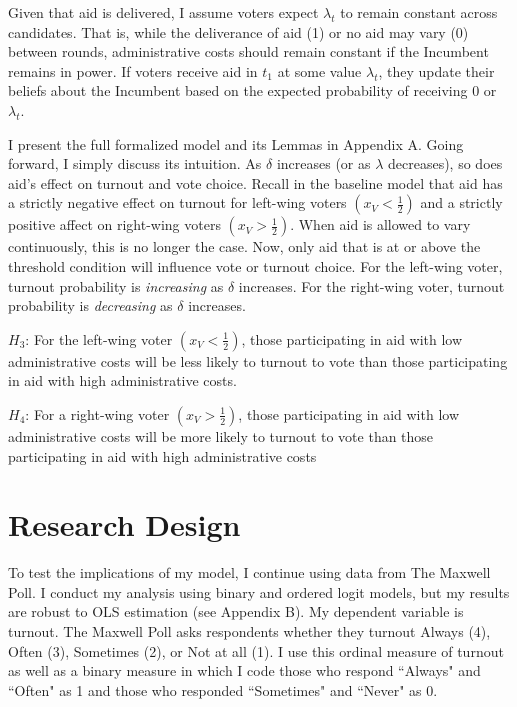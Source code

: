 \documentclass[12pt]{paper}
\begin{document}
Given that aid is delivered, I assume voters expect $\lambda_t$ to remain constant across candidates. That is, while the deliverance of aid (1) or no aid may vary (0) between rounds, administrative costs should remain constant if the Incumbent remains in power. If voters receive aid in $t_1$ at some value $\lambda_t$, they update their beliefs about the Incumbent based on the expected probability of receiving 0 or $\lambda_t$.

I present the full formalized model and its Lemmas in Appendix A. Going forward, I simply discuss its intuition. As $\delta$ increases (or as $\lambda$ decreases), so does aid's effect on turnout and vote choice. Recall in the baseline model that aid has a strictly negative effect on turnout for left-wing voters $(x_V < \frac{1}{2})$ and a strictly positive affect on right-wing voters $(x_V > \frac{1}{2})$. When aid is allowed to vary continuously, this is no longer the case. Now, only aid that is at or above the threshold condition will influence vote or turnout choice. For the left-wing voter, turnout probability is \textit{increasing} as $\delta$ increases. For the right-wing voter, turnout probability is \textit{decreasing} as $\delta$ increases.

$H_3$: For the left-wing voter $(x_V < \frac{1}{2})$, those participating in aid with low administrative costs will be less likely to turnout to vote than those participating in aid with high administrative costs.

$H_4$: For a right-wing voter $(x_V > \frac{1}{2})$, those participating in aid with low administrative costs will be more likely to turnout to vote than those participating in aid with high administrative costs

\section{Research Design}
To test the implications of my model, I continue using data from The Maxwell Poll. I conduct my analysis using binary and ordered logit models, but my results are robust to OLS estimation (see Appendix B). My dependent variable is turnout. The Maxwell Poll asks respondents whether they turnout Always (4), Often (3), Sometimes (2), or Not at all (1). I use this ordinal measure of turnout as well as a binary measure in which I code those who respond ``Always" and ``Often" as 1 and those who responded ``Sometimes" and ``Never" as 0.
\end{document}
